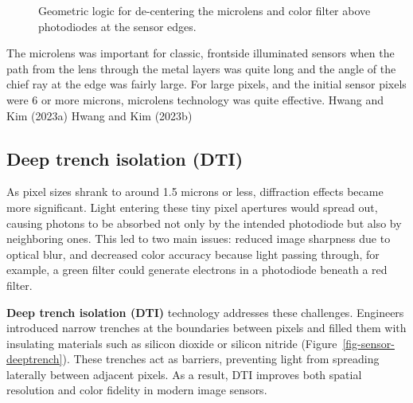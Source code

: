 \documentclass[
  letterpaper,
]{book}
\begin{document}
\begin{figure}


\caption{\label{fig-components-shiftedmicrolens}Geometric logic for
de-centering the microlens and color filter above photodiodes at the
sensor edges.}

\end{figure}%

The microlens was important for classic, frontside illuminated sensors
when the path from the lens through the metal layers was quite long and
the angle of the chief ray at the edge was fairly large. For large
pixels, and the initial sensor pixels were 6 or more microns, microlens
technology was quite effective. Hwang and Kim (2023a) Hwang and Kim
(2023b)

\subsection{Deep trench isolation (DTI)}\label{sec-sensor-dti}

As pixel sizes shrank to around 1.5 microns or less, diffraction effects
became more significant. Light entering these tiny pixel apertures would
spread out, causing photons to be absorbed not only by the intended
photodiode but also by neighboring ones. This led to two main issues:
reduced image sharpness due to optical blur, and decreased color
accuracy because light passing through, for example, a green filter
could generate electrons in a photodiode beneath a red filter.

\textbf{Deep trench isolation (DTI)} technology addresses these
challenges. Engineers introduced narrow trenches at the boundaries
between pixels and filled them with insulating materials such as silicon
dioxide or silicon nitride (Figure~\ref{fig-sensor-deeptrench}). These
trenches act as barriers, preventing light from spreading laterally
between adjacent pixels. As a result, DTI improves both spatial
resolution and color fidelity in modern image sensors.
\end{document}
